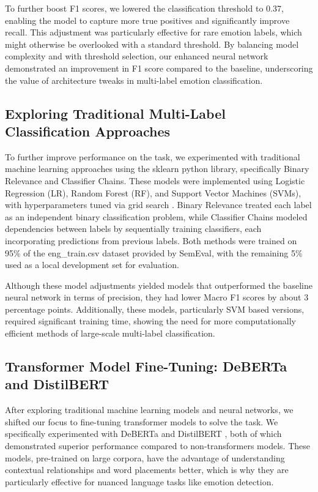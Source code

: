 \documentclass[11pt]{article}
\begin{document}
To further boost F1 scores, we lowered the classification threshold to 0.37, enabling the model to capture more true positives and significantly improve recall. This adjustment was particularly effective for rare emotion labels, which might otherwise be overlooked with a standard threshold. By balancing model complexity and with threshold selection, our enhanced neural network demonstrated an improvement in F1 score compared to the baseline, underscoring the value of architecture tweaks in multi-label emotion classification.

\subsection{Exploring Traditional Multi-Label Classification Approaches}

To further improve performance on the task, we experimented with traditional machine learning approaches using the sklearn python library, specifically Binary Relevance and Classifier Chains. These models were implemented using Logistic Regression (LR), Random Forest (RF), and Support Vector Machines (SVMs), with hyperparameters tuned via grid search \cite{zhang2018binary}. Binary Relevance treated each label as an independent binary classification problem, while Classifier Chains modeled dependencies between labels by sequentially training classifiers, each incorporating predictions from previous labels. Both methods were trained on 95\% of the eng\_train.csv dataset provided by SemEval, with the remaining 5\% used as a local development set for evaluation.

Although these model adjustments yielded models that outperformed the baseline neural network in terms of precision, they had lower Macro F1 scores by about 3 percentage points. Additionally, these models, particularly SVM based versions, required significant training time, showing the need for more computationally efficient methods of large-scale multi-label classification.

\subsection{Transformer Model Fine-Tuning: DeBERTa and DistilBERT}

After exploring traditional machine learning models and neural networks, we shifted our focus to fine-tuning transformer models to solve the task. We specifically experimented with DeBERTa \cite{he2020deberta} and DistilBERT \cite{sanh2019distilbert}, both of which demonstrated superior performance compared to non-transformers models. These models, pre-trained on large corpora, have the advantage of understanding contextual relationships and word placements better, which is why they are particularly effective for nuanced language tasks like emotion detection. 
\end{document}
